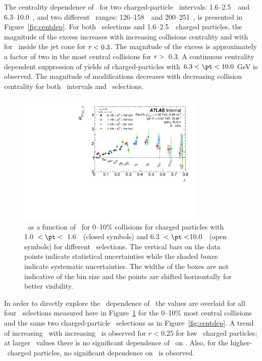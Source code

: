The centrality dependence of \RDptr\ for two charged-particle \pt\ intervals: 1.6--2.5~\GeV\ and \mbox{6.3--10.0~\GeV}, and two different \ptjet\ ranges: 126--158~\GeV\ and 200--251~\GeV, is presented in Figure~\ref{fig:centdep}. 
For both \ptjet\ selections and  1.6--2.5~\GeV\ charged particles, the magnitude of the excess increases
with increasing collisions centrality and with \rvar\, for \rvar\ inside the jet cone for $\mbox{$r$} < 0.3$.  The magnitude of the excess is
approximately a factor of two in the most central collisions for $\mbox{$r$} >$~0.3.
A continuous centrality dependent suppression of  yields of charged-particles with $6.3 < \pt < 10.0$ GeV is observed.
The magnitude of modifications decreases with decreasing collision centrality for both \pt\ 
intervals and \ptjet\ selections.

\begin{figure}[ht]
\centerline{
\includegraphics[width=0.8\textwidth]{figures/results/RDpT_dR_trk3_trk6_cent0.pdf} 
}
\caption{\RDptr\ as a function of \rvar\ for 0--10\% collisions for charged particles with 1.0~$< \pt <$~1.6~\GeV\
(closed symbols) and 6.3~$< \pt <$10.0~\GeV\ (open symbols) for different \ptjet\ selections. The vertical bars on the data points indicate statistical uncertainties while the shaded boxes indicate systematic uncertainties. The widths of the boxes are not indicative of the bin size and the points are shifted horizontally for better visibility.}
\label{fig:ptjetdep}
\end{figure}

In order to directly explore the \ptjet\ dependence of \RDptr\, the values are overlaid for all four
\ptjet\ selections measured here in Figure~\ref{fig:ptjetdep} for the 0--10\% most central collisions 
and the same two charged-particle \pt\ selections as in Figure~\ref{fig:centdep}.
  A trend of increasing \RDptr\ with increasing \ptjet\ is observed for $r < 0.25$ for low 
\pt\ charged particles; at larger \rvar\ values there is no significant dependence of \RDptr\ on \ptjet. 
Also, for the higher-\pt\ charged particles, no significant dependence on \ptjet\ is observed. 



